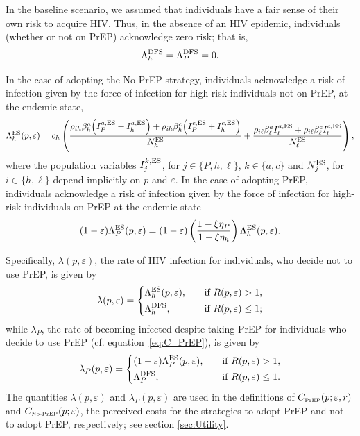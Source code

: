 \documentclass[12pt]{article}
\begin{document}
In the baseline scenario, we assumed that individuals have a fair sense of their own risk to acquire HIV. Thus, in the absence of an HIV epidemic, individuals (whether or not on PrEP) acknowledge zero risk; that is,
\begin{equation}
	\Lambda_h^{\rm DFS}=\Lambda_P^{\rm DFS}=0.
\end{equation} 

In the case of adopting the No-PrEP strategy, individuals acknowledge a risk of infection given by the force of infection for high-risk individuals not on PrEP, at the endemic state,
\begin{equation}
	\Lambda_h^{\rm ES}(p,\varepsilon) = c_h \left( \frac{\rho_{ih} \beta_h^a \Big(I_P^{a,\rm ES} + I_h^{a,\rm ES}\Big) + \rho_{ih} \beta_h^c \Big(I_P^{c,\rm ES} +I_h^{c,\rm ES} \Big)}{N_h^{\rm ES}} + \frac{\rho_{i\ell} \beta_\ell^a I_\ell^{a,\rm ES} + \rho_{i\ell} \beta_\ell^c I_\ell^{c,\rm ES}}{N_\ell^{\rm ES}}\right),
\end{equation}
where the population variables $I_j^{k,\rm ES}$, for $j\in\{P,h,\ell\}$, $k\in\{a,c\}$ and $N_j^{\rm ES}$, for $i\in\{h,\ell\}$ depend implicitly on $p$ and $\varepsilon$. In the case of adopting PrEP, individuals acknowledge a risk of infection given by the force of infection for high-risk individuals on PrEP at the endemic state
\begin{equation} \label{eq:Lambda_P_ES}
	(1-\varepsilon) \Lambda_P^{\rm ES}(p,\varepsilon) = (1-\varepsilon) \left(\frac{1-\xi \eta_P}{1-\xi \eta_h}\right)\Lambda_h^{\rm ES}(p,\varepsilon).
\end{equation} 

Specifically, $\lambda(p,\varepsilon)$, the rate of HIV infection for individuals, who decide not to use PrEP, is given by
\begin{equation}
	\lambda (p,\varepsilon) = \left\{
	\begin{aligned}
		&\Lambda_h^{\rm ES}(p,\varepsilon),& \quad \text{if } R(p,\varepsilon)>1,\\
		&\Lambda_h^{\rm DFS}, & \quad \text{if } R(p,\varepsilon)\leq 1;
	\end{aligned}
	\right.
\end{equation}
while $\lambda_P$, the rate of becoming infected despite taking PrEP for individuals who decide to use PrEP (cf. equation~\eqref{eq:C_PrEP}), is given by
\begin{equation} \label{eq:lambda_P}
	\lambda_P (p,\varepsilon) = \left\{
	\begin{aligned}
		&(1-\varepsilon)\Lambda_P^{\rm ES}(p,\varepsilon),& \quad \text{if } R(p,\varepsilon)>1,\\
		&\Lambda_P^{\rm DFS}, & \quad \text{if } R(p,\varepsilon)\leq 1.
	\end{aligned}
	\right.
\end{equation}
The quantities $\lambda(p,\varepsilon)$ and $\lambda_P(p,\varepsilon)$ are used in the definitions of $C_{\text{\tiny PrEP}}(p;\varepsilon, r)$ and $C_{\text{\tiny No-PrEP}}(p;\varepsilon)$, the perceived costs for the strategies to adopt PrEP and not to adopt PrEP, respectively; see section \ref{sec:Utility}.
\end{document}
